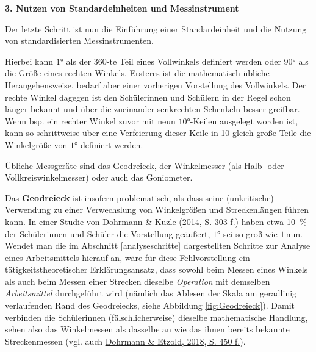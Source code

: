 \documentclass[
]{scrbook}
\theoremstyle{definition}
\theoremstyle{definition}
\theoremstyle{definition}
\theoremstyle{definition}
\theoremstyle{remark}
\begin{document}
\textbf{3. Nutzen von Standardeinheiten und Messinstrument}

Der letzte Schritt ist nun die Einführung einer Standardeinheit und die Nutzung von standardisierten Messinstrumenten.

Hierbei kann \(1°\) als der 360-te Teil eines Vollwinkels definiert werden oder \(90°\) als die Größe eines rechten Winkels. Ersteres ist die mathematisch übliche Herangehensweise, bedarf aber einer vorherigen Vorstellung des Vollwinkels. Der rechte Winkel dagegen ist den Schülerinnen und Schülern in der Regel schon länger bekannt und über die zueinander senkrechten Schenkeln besser greifbar. Wenn bsp. ein rechter Winkel zuvor mit neun \(10°\)-Keilen ausgelegt worden ist, kann so schrittweise über eine Verfeierung dieser Keile in 10 gleich große Teile die Winkelgröße von \(1°\) definiert werden.

Übliche Messgeräte sind das Geodreieck, der Winkelmesser (als Halb- oder Vollkreiswinkelmesser) oder auch das Goniometer.

Das \textbf{Geodreieck} ist insofern problematisch, als dass seine (unkritische) Verwendung zu einer Verwechslung von Winkelgrößen und Streckenlängen führen kann. In einer Studie von Dohrmann \& Kuzle (\protect\hyperlink{ref-Dohrmann2014}{2014, S. 303 f.}) haben etwa 10~\% der Schülerinnen und Schüler die Vorstellung geäußert, \(1°\) sei so groß wie \(1\,\mathrm{mm}\). Wendet man die im Abschnitt \ref{analyseschritte} dargestellten Schritte zur Analyse eines Arbeitsmittels hierauf an, wäre für diese Fehlvorstellung ein tätigkeitstheoretischer Erklärungsansatz, dass sowohl beim Messen eines Winkels als auch beim Messen einer Strecken dieselbe \emph{Operation} mit demselben \emph{Arbeitsmittel} durchgeführt wird (nämlich das Ablesen der Skala am geradlinig verlaufenden Rand des Geodreiecks, siehe Abbildung \ref{fig:Geodreieck}). Damit verbinden die Schülerinnen (fälschlicherweise) dieselbe mathematische Handlung, sehen also das Winkelmessen als dasselbe an wie das ihnen bereits bekannte Streckenmessen (vgl. auch \protect\hyperlink{ref-Dohrmann2018b}{Dohrmann \& Etzold, 2018, S. 450 f.}).
\end{document}
